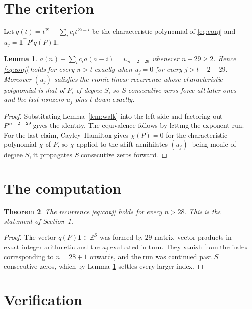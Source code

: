 \documentclass[11pt,a4paper]{article}
\theoremstyle{plain}
\newtheorem{theorem}{Theorem}
\newtheorem{lemma}[theorem]{Lemma}
\theoremstyle{definition}
\begin{document}
\section{The criterion}

Let $q(t)=t^{29}-\sum_i c_i t^{29-i}$ be the characteristic polynomial of
\eqref{eq:conj} and $u_j=\mathbf{1}^{\!\top}P^{j}q(P)\mathbf{1}$.

\begin{lemma}\label{lem:crit}
$a(n)-\sum_i c_i a(n-i)=u_{\,n-2-29}$ whenever $n-29\ge2$. Hence
\eqref{eq:conj} holds for every $n>t$ exactly when $u_j=0$ for every
$j>t-2-29$. Moreover $(u_j)$ satisfies the monic linear recurrence whose
characteristic polynomial is that of $P$, of degree $S$, so $S$ consecutive zeros force all
later ones and the last nonzero $u_j$ pins $t$ down exactly.
\end{lemma}

\begin{proof}
Substituting Lemma~\ref{lem:walk} into the left side and factoring out
$P^{\,n-2-29}$ gives the identity. The equivalence follows by letting the exponent
run. For the last claim, Cayley--Hamilton gives $\chi(P)=0$ for the characteristic
polynomial $\chi$ of $P$, so $\chi$ applied to the shift annihilates $(u_j)$; being monic of
degree $S$, it propagates $S$ consecutive zeros forward.
\end{proof}

\section{The computation}

\begin{theorem}
The recurrence \eqref{eq:conj} holds for every $n>28$. This is the statement of
Section~1.
\end{theorem}

\begin{proof}
The vector $q(P)\mathbf{1}\in\mathbb{Z}^{S}$ was formed by $29$ matrix--vector
products in exact integer arithmetic and the $u_j$ evaluated in turn. They vanish from the
index corresponding to $n=28+1$ onwards, and the run was continued past $S$ consecutive
zeros, which by Lemma~\ref{lem:crit} settles every larger index.
\end{proof}

\section{Verification}
\end{document}
